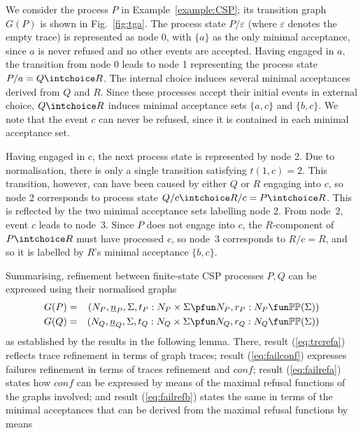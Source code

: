 \begin{example}\label{ex:a}
We consider the process $P$ in Example~\ref{example:CSP}; its transition
graph $G(P)$ is shown in Fig.~\ref{fig:tga}. The process state
$P/\varepsilon$ (where $\varepsilon$ denotes the empty trace) is represented
as node 0, with $\{ a\}$ as the only minimal acceptance, since $a$ is never
refused and no other events are accepted. Having engaged in $a$, the
transition from node 0 leads to node 1 representing the process state $P/a
= Q\intchoice R$. The internal choice induces several minimal acceptances
derived from $Q$ and $R$. Since these processes accept their initial events
in external choice, $Q\intchoice R$ induces minimal acceptance sets $\{a,c\}$
and $\{b,c\}$. We note that the event $c$ can never be refused, since it is
contained in each minimal acceptance set.

Having engaged in $c$, the next process state is represented by node 2. Due
to normalisation, there is only a single transition satisfying $t(1,c) = 2$.
This transition, however, can have been caused by either $Q$ or $R$ engaging
into $c$, so node 2 corresponds to process state $Q/c \intchoice R/c = P
\intchoice R$. This is reflected by the two minimal acceptance sets labelling
node 2. From node~2, event $c$ leads to node~3. Since $P$ does not engage
into $c$, the $R$-component of $P\intchoice R$ must have processed $c$, so
node~3 corresponds to $R/c = R$, and so it is labelled by $R$'s minimal
acceptance $\{b,c\}$. \xbox
\end{example}
%
\noindent%
Summarising, refinement between finite-state CSP processes $P, Q$ can be
expressed using their normalised graphs
\begin{eqnarray*}
G(P) & = & ( N_P, {\ii n}_P, \Sigma, t_P : N_P\times\Sigma \pfun N_P, r_P : N_P \fun \mathbb{P}\mathbb{P}(\Sigma))
\\
G(Q) & = & ( N_Q, {\ii n}_Q, \Sigma, t_Q : N_Q\times\Sigma \pfun N_Q, r_Q : N_Q \fun \mathbb{P}\mathbb{P}(\Sigma))
\end{eqnarray*}
%
as established by the results  in the following lemma. There, result
(\ref{eq:trcrefa}) reflects trace refinement in terms of graph traces; result
(\ref{eq:failconf}) expresses failures refinement in terms of traces
refinement and $conf$; result (\ref{eq:failrefa}) states how $conf$ can be
expressed by means of the maximal refusal functions of the graphs involved;
and result (\ref{eq:failrefb}) states the same in terms of the minimal
acceptances that can be derived from the maximal refusal functions by means
